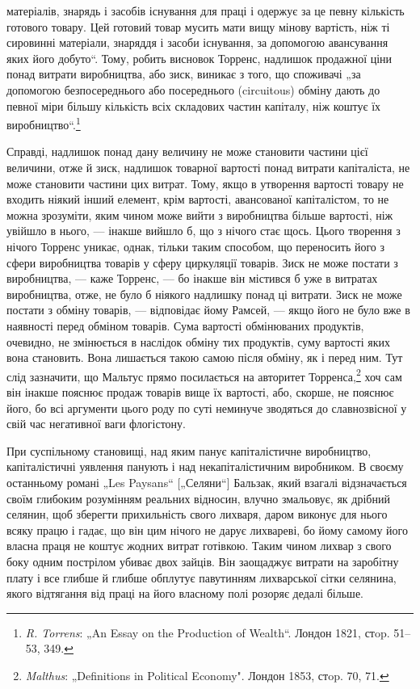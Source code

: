 \parcont{}  %
матеріалів, знарядь і засобів існування для праці і одержує за
це певну кількість готового товару. Цей готовий товар мусить
мати вищу мінову вартість, ніж ті сировинні матеріали, знаряддя
і засоби існування, за допомогою авансування яких його
добуто“. Тому, робить висновок Торренс, надлишок продажної ціни
понад витрати виробництва, або зиск, виникає з того, що споживачі
„за допомогою безпосереднього або посереднього (circuitous)
обміну дають до певної міри більшу кількість всіх складових
частин капіталу, ніж коштує їх виробництво“.\footnote{
\emph{R. Torrens}: „An Essay on the Production of Wealth“. Лондон 1821, стop.
51--53, 349.
}

Справді, надлишок понад дану величину не може становити
частини цієї величини, отже й зиск, надлишок товарної вартості
понад витрати капіталіста, не може становити частини цих витрат.
Тому, якщо в утворення вартості товару не входить
ніякий інший елемент, крім вартості, авансованої капіталістом,
то не можна зрозуміти, яким чином може вийти з виробництва
більше вартості, ніж увійшло в нього, — інакше вийшло б, що
з нічого стає щось. Цього творення з нічого Торренс уникає,
однак, тільки таким способом, що переносить його з сфери виробництва
товарів у сферу циркуляції товарів. Зиск не може постати
з виробництва, — каже Торренс, — бо інакше він містився б уже
в витратах виробництва, отже, не було б ніякого надлишку понад
ці витрати. Зиск не може постати з обміну товарів, — відповідає
йому Рамсей, — якщо його не було вже в наявності перед обміном
товарів. Сума вартості обмінюваних продуктів, очевидно,
не змінюється в наслідок обміну тих продуктів, суму вартості
яких вона становить. Вона лишається такою самою після обміну,
як і перед ним. Тут слід зазначити, що Мальтус прямо посилається
на авторитет Торренса,\footnote{
\emph{Malthus}: „Definitions in Political Economy". Лондон 1853, стop. 70, 71.
} хоч сам він інакше пояснює
продаж товарів вище їх вартості, або, скорше, не пояснює його,
бо всі аргументи цього роду по суті неминуче зводяться до
славнозвісної у свій час негативної ваги флогістону.

При суспільному становищі, над яким панує капіталістичне виробництво,
капіталістичні уявлення панують і над некапіталістичним
виробником. В своєму останньому романі „Les Paysans“
[„Селяни“] Бальзак, який взагалі відзначається своїм глибоким
розумінням реальних відносин, влучно змальовує, як дрібний
селянин, щоб зберегти прихильність свого лихваря, даром виконує
для нього всяку працю і гадає, що він цим нічого не
дарує лихвареві, бо йому самому його власна праця не коштує
жодних витрат готівкою. Таким чином лихвар з свого боку
одним пострілом убиває двох зайців. Він заощаджує витрати
на заробітну плату і все глибше й глибше обплутує павутинням
лихварської сітки селянина, якого відтягання від праці на його
власному полі розоряє дедалі більше.
